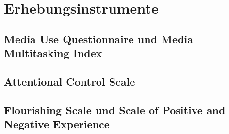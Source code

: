 \section{Erhebungsinstrumente}\label{section.erhebungsinstrumente}
\subsection{Media Use Questionnaire und Media Multitasking Index}\label{subsection.muq}
\subsection{Attentional Control Scale}\label{subsection.acs}
\subsection{Flourishing Scale und Scale of Positive and Negative Experience}\label{subsection.flourishingScale}



